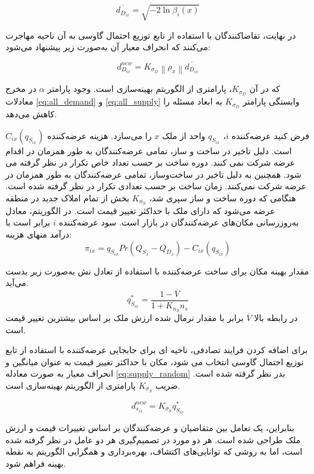 \begin{equation}
	\overline{d_{D_{ix}}} = \sqrt{-2\ln\beta_i(x)}
\end{equation}

در نهایت، تقاضاکنندگان با استفاده از تابع توزیع احتمال گاوسی به آن ناحیه مهاجرت می‌کنند که انحراف معیار آن به‌صورت زیر پیشنهاد می‌شود:

\begin{equation}
	d_{D_{ix}}^{new} = K_{\sigma_D}  \left\|\rho_x \right\| \overline{d_{D_{ix}}} 
\end{equation}

که در آن
$K_{\sigma_D} $،
 پارامتری از الگوریتم بهینه‌سازی است. وجود پارامتر $\alpha$ در مخرج 
 معادلات
 \eqref{eq:all_demand}
 و
  \eqref{eq:all_supply}
وابستگی پارامتر $K_{\sigma_D} $ به ابعاد مسئله را کاهش می‌دهد.
 
 
فرض کنید عرضه‌کننده 
$i$،
  $q_{S_{ix}}$
    واحد از ملک $x$  را می‌سازد. هزینه عرضه‌کننده
     $C_{ix}(q_{S_{ix}})$
     است.
 دلیل تاخیر در ساخت و ساز، تمامی ‌عرضه‌کنندگان به طور همزمان در اقدام عرضه شرکت نمی کنند. دوره ساخت بر حسب تعداد خاص تکرار در نظر گرفته می شود.
همچنین به دلیل تاخیر در ساخت‌و‌ساز، تمامی ‌عرضه‌کنندگان به طور همزمان در  عرضه شرکت نمی‌کنند.
زمان ساخت بر حسب تعدادی تکرار در نظر گرفته شده است.
هنگامی که دوره ساخت و ساز سپری شد، $K_{n_S}$ بخش از تمام املاک جدید در منطقه عرضه می‌شود که دارای ملک با حداکثر تغییر قیمت است. در الگوریتم، معادل به‌روزرسانی مکان‌های ‌عرضه‌کنندگان در بازار است.
سود ‌عرضه‌کننده $i$ برابر است با درآمد منهای هزینه:
\begin{equation}
	\pi_{ix} = q_{S_{ix}} Pr(Q_{S_x} - Q_{D_x}) - C_{ix}(q_{S_{ix}})
\end{equation}

مقدار بهینه مکان برای ساخت عرضه‌کننده با استفاده از تعادل نش به‌صورت زیر بدست می‌آید.
\begin{equation}
	q_{S_{ix}} ^* = \dfrac{1-\overline{V}}{1+K_{n_S}n_s}
\end{equation}
در رابطه بالا $\overline{V}$ برابر با مقدار نرمال شده ارزش ملک بر اساس بیشترین تغییر قیمت است.

برای اضافه کردن فرایند تصادفی، ناحیه ای برای جابجایی ‌عرضه‌کننده با استفاده از تابع توزیع احتمال گاوسی انتخاب می شود، مکان با حداکثر تغییر قیمت به عنوان میانگین و انحراف معیار به صورت معادله \eqref{eq:supply_random} بدر نظر گرفته شده است. ضریب
$K_{\sigma_S} $
پارامتری از الگوریتم بهینه‌سازی است.

\begin{equation}\label{eq:supply_random}
	d_{s_{ix}}^{new} = K_{\sigma_S}  	q_{S_{ix}} ^*
\end{equation}
 
 بنابراین، یک تعامل بین متقاضیان و ‌عرضه‌کنندگان بر اساس تغییرات قیمت و  ارزش ملک طراحی شده است. هر دو مورد در تصمیم‌گیری هر دو عامل در نظر گرفته شده است، اما به روشی که توانایی‌های اکتشاف، بهره‌برداری و همگرایی الگوریتم به نقطه بهینه فراهم شود.
 
 
 
 
 
 